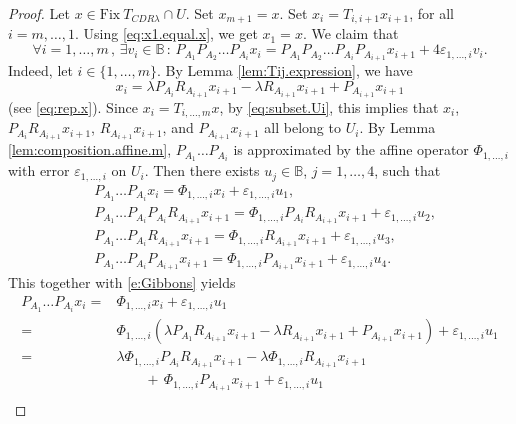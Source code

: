 \documentclass[12pt]{article}
\theoremstyle{definition}
\newcommand{\Fix}{\mathrm{Fix}\ }
\begin{document}
\begin{proof}
Let $x\in\Fix T_{CDR\lambda}\cap U$.
Set $x_{m+1}=x$. Set $x_i=T_{i,i+1}x_{i+1}$, for all $i=m,\dots,1$. Using \eqref{eq:x1.equal.x}, we get $x_1=x$.
We claim that
\begin{equation}\label{eq:loop.proj}
\forall i=1,\dots,m\,,\, \exists v_i\in \mathbb B\,:\,P_{A_1}P_{A_2}\dots P_{A_i}x_i=P_{A_1}P_{A_2}\dots P_{A_i}P_{A_{i+1}}x_{i+1}+4\varepsilon_{1,\dots,i} v_i.
\end{equation}
Indeed, let $i\in\{1,\dots,m\}$.
By Lemma \ref{lem:Tij.expression}, we have
\begin{equation}\label{e:Gibbons}
x_i=\lambda P_{A_i}R_{A_{i+1}}x_{i+1}-\lambda R_{A_{i+1}}x_{i+1}+P_{A_{i+1}}x_{i+1}
\end{equation}
(see \eqref{eq:rep.x}).
Since $x_i=T_{i,\dots,m}x$, by \eqref{eq:subset.Ui}, this implies that
$x_i$, $P_{A_i}R_{A_{i+1}}x_{i+1}$, $R_{A_{i+1}}x_{i+1}$, and $P_{A_{i+1}}x_{i+1}$
all belong to $U_i$.
By Lemma \ref{lem:composition.affine.m}, $P_{A_1} \dots P_{A_i}$ is approximated by the affine operator $\Phi_{1,\dots,i}$ with error $\varepsilon_{1,\dots,i}$ on $U_i$.
Then there exists $u_j\in \mathbb B$, $j=1,\dots,4$, such that 
\begin{equation}
\begin{array}{rl}
&P_{A_1} \dots P_{A_i}x_i= \Phi_{1,\dots,i} x_i +\varepsilon_{1,\dots,i} u_1,\\
& P_{A_1} \dots P_{A_i} P_{A_i}R_{A_{i+1}}x_{i+1}=\Phi_{1,\dots,i} P_{A_i}R_{A_{i+1}}x_{i+1}+\varepsilon_{1,\dots,i} u_{2},\\
&P_{A_1} \dots P_{A_i} R_{A_{i+1}}x_{i+1}=\Phi_{1,\dots,i} R_{A_{i+1}}x_{i+1}+\varepsilon_{1,\dots,i} u_3,\\
&P_{A_1} \dots P_{A_i}P_{A_{i+1}}x_{i+1}=\Phi_{1,\dots,i}P_{A_{i+1}}x_{i+1}+\varepsilon_{1,\dots,i} u_4.
\end{array}
\end{equation}
This together with \eqref{e:Gibbons} yields
\begin{equation}
\begin{array}{rl}
P_{A_1} \dots P_{A_i}x_i=&\Phi_{1,\dots,i} x_i +\varepsilon_{1,\dots,i} u_1\\
=&\Phi_{1,\dots,i} (\lambda P_{A_1}R_{A_{i+1}}x_{i+1}-\lambda R_{A_{i+1}}x_{i+1}+P_{A_{i+1}}x_{i+1}) +\varepsilon_{1,\dots,i} u_1\\
=&\lambda \Phi_{1,\dots,i} P_{A_i}R_{A_{i+1}}x_{i+1}-\lambda \Phi_{1,\dots,i} R_{A_{i+1}}x_{i+1}\\
& \qquad+\,\Phi_{1,\dots,i}P_{A_{i+1}}x_{i+1} +\varepsilon_{1,\dots,i}  u_1\\

\end{array}
\end{equation}
\end{proof}
\end{document}
